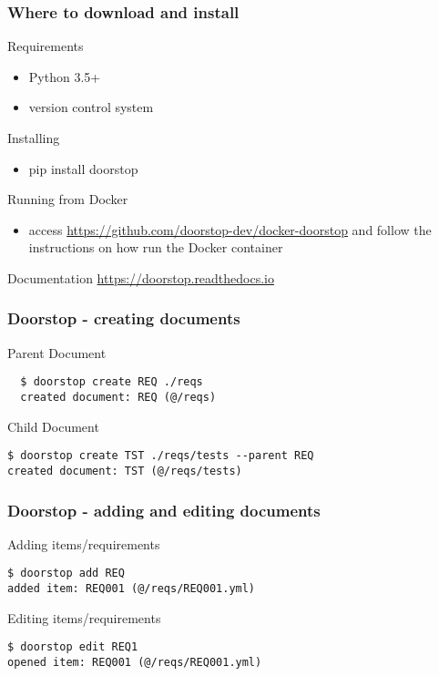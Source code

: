 \documentclass[aspectratio=169]{beamer}
\begin{document}
\begin{frame}
  \frametitle{Where to download and install}  
  \begin{block}{Requirements}
  \begin{itemize}
    \item Python 3.5+
    \item version control system  
  \end{itemize}
  \end{block}
  \begin{block}{Installing}
  \begin{itemize}
    \item pip install doorstop  
  \end{itemize}
  \end{block}
  \begin{block}{Running from Docker}
  \begin{itemize}
    \item access \url{https://github.com/doorstop-dev/docker-doorstop} and follow the instructions on how run the Docker container
  \end{itemize}
  \end{block}

  \begin{alertblock}{Documentation}
    \centering\url{https://doorstop.readthedocs.io}
  \end{alertblock}
\end{frame}

\begin{frame}[fragile]
  \frametitle{Doorstop - creating documents}
  \begin{block}{Parent Document}
  \begin{verbatim}
  $ doorstop create REQ ./reqs
  created document: REQ (@/reqs)
  \end{verbatim}  
  \end{block}
  \begin{block}{Child Document}
  \begin{verbatim}
$ doorstop create TST ./reqs/tests --parent REQ
created document: TST (@/reqs/tests)  \end{verbatim}  
  \end{block}
\end{frame}

\begin{frame}[fragile]
  \frametitle{Doorstop - adding and editing documents}
  \begin{block}{Adding items/requirements}
   \begin{verbatim}
$ doorstop add REQ
added item: REQ001 (@/reqs/REQ001.yml)  
   \end{verbatim} 
  \end{block}
  \begin{block}{Editing items/requirements}
  \begin{verbatim}
$ doorstop edit REQ1
opened item: REQ001 (@/reqs/REQ001.yml) 
  \end{verbatim}
  \end{block}
\end{frame}
\end{document}
